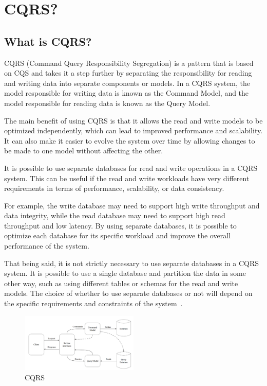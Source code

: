 \documentclass[11pt,conference]{IEEEtran}
\begin{document}
\section{CQRS?}

\subsection{What is CQRS?}
CQRS (Command Query Responsibility Segregation) is a pattern that is based on CQS and takes it a step further by separating the responsibility for reading and writing data into separate components or models. In a CQRS system, the model responsible for writing data is known as the Command Model, and the model responsible for reading data is known as the Query Model.

The main benefit of using CQRS is that it allows the read and write models to be optimized independently, which can lead to improved performance and scalability. It can also make it easier to evolve the system over time by allowing changes to be made to one model without affecting the other.

It is possible to use separate databases for read and write operations in a CQRS system. This can be useful if the read and write workloads have very different requirements in terms of performance, scalability, or data consistency.

For example, the write database may need to support high write throughput and data integrity, while the read database may need to support high read throughput and low latency. By using separate databases, it is possible to optimize each database for its specific workload and improve the overall performance of the system.

That being said, it is not strictly necessary to use separate databases in a CQRS system. It is possible to use a single database and partition the data in some other way, such as using different tables or schemas for the read and write models. The choice of whether to use separate databases or not will depend on the specific requirements and constraints of the system~\cite{martinfowler-cqrs}.

\begin{figure}[h]
    \centering
    \includegraphics[width=0.5\textwidth]{images/CQRS.png}
    \caption{CQRS~\cite[15]{cqrs-in-practise}}
    \label{fig:cqrs}
\end{figure}
\end{document}
